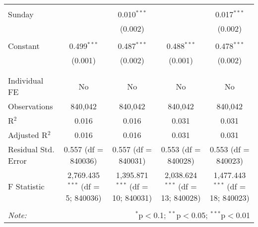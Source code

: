 \documentclass[
]{article}
\begin{document}
\begin{table}[!htbp]
{\begin{tabular}{@{\extracolsep{5pt}}lcccc}
  & & & & \\ 
 Sunday &  & 0.010$^{***}$ &  & 0.017$^{***}$ \\ 
  &  & (0.002) &  & (0.002) \\ 
  & & & & \\ 
 Constant & 0.499$^{***}$ & 0.487$^{***}$ & 0.488$^{***}$ & 0.478$^{***}$ \\ 
  & (0.001) & (0.002) & (0.001) & (0.002) \\ 
  & & & & \\ 
\hline \\[-1.8ex] 
Individual FE & No & No & No & No \\ 
Observations & 840,042 & 840,042 & 840,042 & 840,042 \\ 
R$^{2}$ & 0.016 & 0.016 & 0.031 & 0.031 \\ 
Adjusted R$^{2}$ & 0.016 & 0.016 & 0.031 & 0.031 \\ 
Residual Std. Error & 0.557 (df = 840036) & 0.557 (df = 840031) & 0.553 (df = 840028) & 0.553 (df = 840023) \\ 
F Statistic & 2,769.435$^{***}$ (df = 5; 840036) & 1,395.871$^{***}$ (df = 10; 840031) & 2,038.624$^{***}$ (df = 13; 840028) & 1,477.443$^{***}$ (df = 18; 840023) \\ 
\hline 
\hline \\[-1.8ex] 
\textit{Note:}  & \multicolumn{4}{r}{$^{*}$p$<$0.1; $^{**}$p$<$0.05; $^{***}$p$<$0.01} \\ 
\end{tabular}
} 
\end{table} 
\newpage
\end{document}
